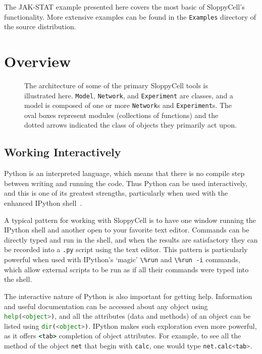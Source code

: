 \documentclass[12pt]{article}
\makeatletter
\newcommand{\py}[1]{\lstinline[language=Python, showstringspaces=False]@#1@}
\newcommand{\shell}[1]{\lstinline[language=csh, showstringspaces=False]!#1!}
\makeatother
\begin{document}
The JAK-STAT example presented here covers the most basic of SloppyCell's functionality.
More extensive examples can be found in the \shell{Examples} directory of the source distribution.

\section{Overview}

\begin{figure}
\begin{center}

\end{center}
\caption{The architecture of some of the primary SloppyCell tools is illustrated here. \py{Model}, \py{Network}, and \py{Experiment} are classes, and a model is composed of one or more \py{Network}s and \py{Experiment}s. The oval boxes represent modules (collections of functions) and the dotted arrows indicated the class of objects they primarily act upon.}
\end{figure}

\subsection{Working Interactively}
Python is an interpreted language, which means that there is no compile step between writing and running the code.
Thus Python can be used interactively, and this is one of its greatest strengths, particularly when used with the enhanced IPython shell~\cite{bib:Perez2007}.

A typical pattern for working with SloppyCell is to have one window running the IPython shell and another open to your favorite text editor.
Commands can be directly typed and run in the shell, and when the results are satisfactory they can be recorded into a \shell{.py} script using the text editor.
This pattern is particularly powerful when used with IPython's `magic' \shell{\%run} and \shell{\%run -i} commands, which allow external scripts to be run as if all their commands were typed into the shell.

The interactive nature of Python is also important for getting help.
Information and useful documentation can be accessed about any object using \py{help(<object>)}, and all the attributes (data and methods) of an object can be listed using \py{dir(<object>)}.
IPython makes such exploration even more powerful, as it offers \shell{<tab>} completion of object attributes.
For example, to see all the method of the object \py{net} that begin with \py{calc}, one would type \py{net.calc<tab>}.  
\end{document}

